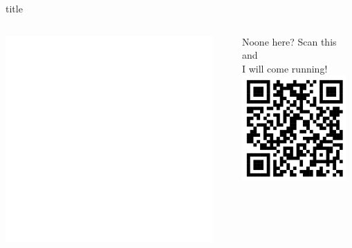 \documentclass[final, pt]{beamer}
\begin{document}
    \begin{frame}[t]
        \thispagestyle{empty}

        \begin{beamercolorbox}[sep=0em,wd=\textwidth]{title}
            \begin{columns}
                \begin{column}{0.2\textwidth}
                    \hspace{1.2cm}
                    \includegraphics[height=8cm]{data/uio.png}
                \end{column}
                \begin{column}{0.6\textwidth}
                    \centering\\[2.3cm]
                    \vspace{2.3cm}
                \end{column}
                \begin{column}{0.2\textwidth}
                    \hfill
                    \begin{minipage}{0.6\textwidth}
                        \centering
                        Noone here? Scan this and\\[-0.2cm]
                        I will come running!\\[0.5cm]
                        \includegraphics[height=4cm]{data/qr.png}\\

\end{minipage}
\end{column}
\end{columns}
\end{beamercolorbox}
\end{frame}
\end{document}
